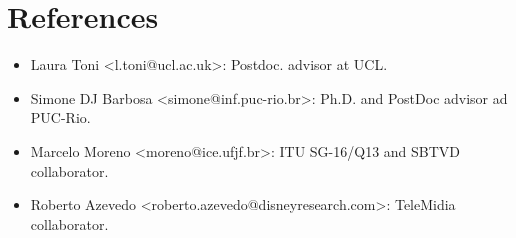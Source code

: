 \documentclass[10pt,a4paper,sans,colorlinks]{moderncv}
\begin{document}
\section{References}

\begin{itemize}[nosep]
  \item Laura Toni <l.toni@ucl.ac.uk>: Postdoc. advisor at UCL.
  
  
  \item Simone DJ Barbosa <simone@inf.puc-rio.br>: Ph.D. and PostDoc advisor ad PUC-Rio.
  
  \item Marcelo Moreno <moreno@ice.ufjf.br>: ITU SG-16/Q13 and SBTVD collaborator. 
  
  \item Roberto Azevedo <roberto.azevedo@disneyresearch.com>: TeleMidia collaborator. 
  
  
  
\end{itemize}
\end{document}
